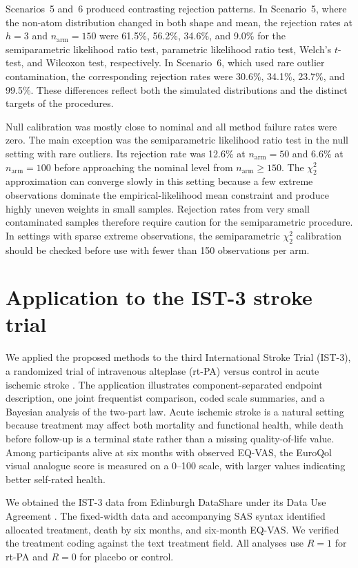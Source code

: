 \documentclass[11pt]{article}
\newcommand{\ApplicationDatasetDescription}{the third International Stroke Trial (IST-3), a randomized trial of intravenous alteplase (rt-PA) versus control in acute ischemic stroke}
\begin{document}
Scenarios~5 and~6 produced contrasting rejection patterns. In Scenario~5, where the non-atom distribution changed in both shape and mean, the rejection rates at $h=3$ and $n_{\mathrm{arm}}=150$ were 61.5\%, 56.2\%, 34.6\%, and 9.0\% for the semiparametric likelihood ratio test, parametric likelihood ratio test, Welch's $t$-test, and Wilcoxon test, respectively. In Scenario~6, which used rare outlier contamination, the corresponding rejection rates were 30.6\%, 34.1\%, 23.7\%, and 99.5\%. These differences reflect both the simulated distributions and the distinct targets of the procedures.

Null calibration was mostly close to nominal and all method failure rates were zero. The main exception was the semiparametric likelihood ratio test in the null setting with rare outliers. Its rejection rate was 12.6\% at $n_{\mathrm{arm}}=50$ and 6.6\% at $n_{\mathrm{arm}}=100$ before approaching the nominal level from $n_{\mathrm{arm}}\geq150$. The $\chi^2_2$ approximation can converge slowly in this setting because a few extreme observations dominate the empirical-likelihood mean constraint and produce highly uneven weights in small samples. Rejection rates from very small contaminated samples therefore require caution for the semiparametric procedure. In settings with sparse extreme observations, the semiparametric $\chi^2_2$ calibration should be checked before use with fewer than 150 observations per arm.

\section{Application to the IST-3 stroke trial}\label{sec:application}

We applied the proposed methods to \ApplicationDatasetDescription{} \citep{IST3Lancet2012,IST3DataShare}. The application illustrates component-separated endpoint description, one joint frequentist comparison, coded scale summaries, and a Bayesian analysis of the two-part law. Acute ischemic stroke is a natural setting because treatment may affect both mortality and functional health, while death before follow-up is a terminal state rather than a missing quality-of-life value. Among participants alive at six months with observed EQ-VAS, the EuroQol visual analogue score is measured on a 0--100 scale, with larger values indicating better self-rated health.

We obtained the IST-3 data from Edinburgh DataShare under its Data Use Agreement \citep{IST3DataShare}. The fixed-width data and accompanying SAS syntax identified allocated treatment, death by six months, and six-month EQ-VAS\@. We verified the treatment coding against the text treatment field. All analyses use $R=1$ for rt-PA and $R=0$ for placebo or control.
\end{document}
